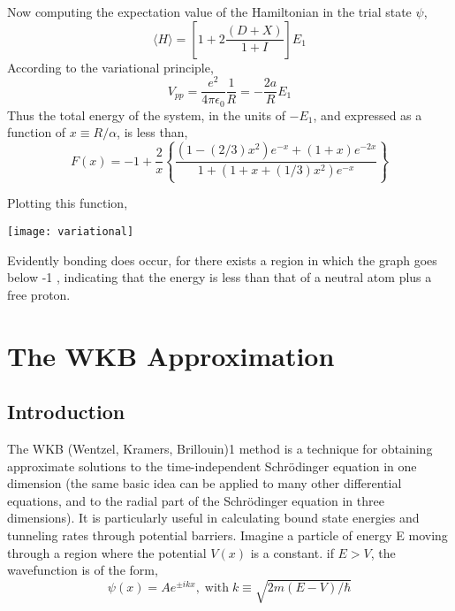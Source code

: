 Now computing the expectation value of the Hamiltonian in the trial state $\psi$,
\begin{equation}
	\langle H\rangle=\left[1+2\frac{(D+X)}{1+I}\right]E_1
\end{equation}
According to the variational principle,
\begin{equation}
	V_{pp}=\frac{e^2}{4\pi\epsilon_0}\frac{1}{R}=-\frac{2a}{R}E_1
\end{equation}
Thus the total energy of the system, in the units of $-E_1$, and expressed as a function of $x\equiv R/\alpha$, is less than,
\begin{equation}
	F(x)=-1+\frac{2}{x}\left\{\frac{(1-(2/3)x^2)e^{-x}+(1+x)e^{-2x}}{1+(1+x+(1/3)x^2)e^{-x}}\right\}
\end{equation}

Plotting this function,
\begin{center}
	\texttt{[image: variational]}
\end{center}

Evidently bonding does occur, for there exists a region in which the graph goes below -1 , indicating that the energy is less than that of a neutral atom plus a free proton.

\newpage


\section{The WKB Approximation}
\subsection{Introduction}
The WKB (Wentzel, Kramers, Brillouin)1 method is a technique for obtaining approximate solutions to the
time-independent Schrödinger equation in one dimension (the same basic idea can be applied to many other
differential equations, and to the radial part of the Schrödinger equation in three dimensions). It is particularly
useful in calculating bound state energies and tunneling rates through potential barriers.
Imagine a particle of energy E moving through a region where the potential $V(x)$ is a constant. if $E>V$, the wavefunction is of the form,
\begin{equation*}
	\psi(x)=Ae^{\pm ikx}, \; \text{with}\; k\equiv\sqrt{2m(E-V)/\hbar}
\end{equation*}

